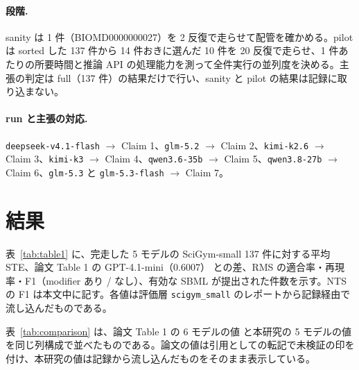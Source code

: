 \documentclass{article}
\providecommand{\unverified}[1]{#1}
\begin{document}
\paragraph{段階.}
sanity は 1 件（BIOMD0000000027）を 2 反復で走らせて配管を確かめる。pilot は sorted した 137 件から 14 件おきに選んだ 10 件を 20 反復で走らせ、1 件あたりの所要時間と推論 API の処理能力を測って全件実行の並列度を決める。主張の判定は full（137 件）の結果だけで行い、sanity と pilot の結果は記録に取り込まない。

\paragraph{run と主張の対応.}
\texttt{deepseek-v4.1-flash} $\to$ Claim 1、\texttt{glm-5.2} $\to$ Claim 2、\texttt{kimi-k2.6} $\to$ Claim 3、\texttt{kimi-k3} $\to$ Claim 4、\texttt{qwen3.6-35b} $\to$ Claim 5、\texttt{qwen3.8-27b} $\to$ Claim 6、\texttt{glm-5.3} と \texttt{glm-5.3-flash} $\to$ Claim 7。


\section{結果}
\label{sec:results}
表~\ref{tab:table1} に、完走した 5 モデルの SciGym-small 137 件に対する平均 STE、論文 Table 1 の GPT-4.1-mini（\unverified{0.6007}）\cite[s1.p5]{duan-2025-measuring} との差、RMS の適合率・再現率・F1（modifier あり / なし）、有効な SBML が提出された件数を示す。NTS の F1 は本文中に記す。各値は評価層 \texttt{scigym\_small} のレポートから記録経由で流し込んだものである。

{\scriptsize\setlength{\tabcolsep}{2.5pt}}

表~\ref{tab:comparison} は、論文 Table 1 の 6 モデルの値 \cite[s1.p5]{duan-2025-measuring} と本研究の 5 モデルの値を同じ列構成で並べたものである。論文の値は引用としての転記で未検証の印を付け、本研究の値は記録から流し込んだものをそのまま表示している。
\end{document}
